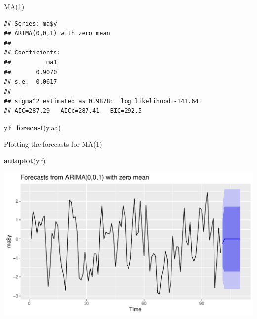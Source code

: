 \documentclass[ignorenonframetext,]{beamer}
\newenvironment{Shaded}{\begin{snugshade}}{\end{snugshade}}
\newcommand{\KeywordTok}[1]{\textcolor[rgb]{0.13,0.29,0.53}{\textbf{#1}}}
\newcommand{\NormalTok}[1]{#1}
\newcommand{\OperatorTok}[1]{\textcolor[rgb]{0.81,0.36,0.00}{\textbf{#1}}}
\begin{document}
\begin{frame}[fragile]{MA(1)}
\protect\hypertarget{ma1}{}

\begin{Shaded}
\end{Shaded}

\begin{verbatim}
## Series: ma$y 
## ARIMA(0,0,1) with zero mean 
## 
## Coefficients:
##          ma1
##       0.9070
## s.e.  0.0617
## 
## sigma^2 estimated as 0.9878:  log likelihood=-141.64
## AIC=287.29   AICc=287.41   BIC=292.5
\end{verbatim}

\begin{Shaded}
\begin{Highlighting}[]
\NormalTok{y.f=}\KeywordTok{forecast}\NormalTok{(y.aa)}
\end{Highlighting}
\end{Shaded}

\end{frame}

\begin{frame}[fragile]{Plotting the forecasts for MA(1)}
\protect\hypertarget{plotting-the-forecasts-for-ma1}{}

\begin{Shaded}
\begin{Highlighting}[]
\KeywordTok{autoplot}\NormalTok{(y.f)}
\end{Highlighting}
\end{Shaded}

\includegraphics{figure/unnamed-chunk-562-1.pdf}

\end{frame}
\end{document}

